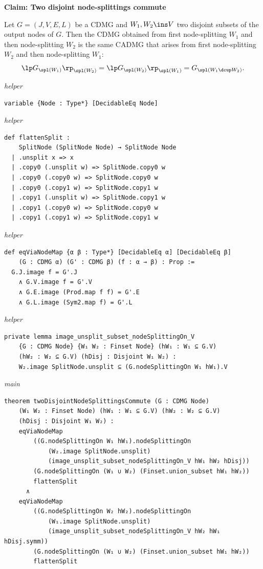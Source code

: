 \noindent\textbf{Claim: Two disjoint node-splittings commute}\par\smallskip
{\appendixTexSize
   Let $G=(J,V,E,L)$ be a CDMG and $W_1, W_2 \ins V$ two disjoint subsets of the output nodes of $G$.
   Then the CDMG obtained from first node-splitting $W_1$ and then node-splitting $W_2$ is the same CADMG that arises from first node-splitting $W_2$ and then node-splitting $W_1$:
   \[ \lp G_{\spl(W_1)} \rp_{\spl(W_2)} =  \lp G_{\spl(W_2)} \rp_{\spl(W_1)}  =  G_{\spl(W_1 \dcup W_2)}.   \]
\par}
\smallskip
{\small\textit{helper}}
\begin{verbatim}
variable {Node : Type*} [DecidableEq Node]
\end{verbatim}
{\small\textit{helper}}
\begin{verbatim}
def flattenSplit :
    SplitNode (SplitNode Node) → SplitNode Node
  | .unsplit x => x
  | .copy0 (.unsplit w) => SplitNode.copy0 w
  | .copy0 (.copy0 w) => SplitNode.copy0 w
  | .copy0 (.copy1 w) => SplitNode.copy1 w
  | .copy1 (.unsplit w) => SplitNode.copy1 w
  | .copy1 (.copy0 w) => SplitNode.copy0 w
  | .copy1 (.copy1 w) => SplitNode.copy1 w
\end{verbatim}
{\small\textit{helper}}
\begin{verbatim}
def eqViaNodeMap {α β : Type*} [DecidableEq α] [DecidableEq β]
    (G : CDMG α) (G' : CDMG β) (f : α → β) : Prop :=
  G.J.image f = G'.J
    ∧ G.V.image f = G'.V
    ∧ G.E.image (Prod.map f f) = G'.E
    ∧ G.L.image (Sym2.map f) = G'.L
\end{verbatim}
{\small\textit{helper}}
\begin{verbatim}
private lemma image_unsplit_subset_nodeSplittingOn_V
    {G : CDMG Node} {W₁ W₂ : Finset Node} (hW₁ : W₁ ⊆ G.V)
    (hW₂ : W₂ ⊆ G.V) (hDisj : Disjoint W₁ W₂) :
    W₂.image SplitNode.unsplit ⊆ (G.nodeSplittingOn W₁ hW₁).V
\end{verbatim}
{\small\textit{main}}
\begin{verbatim}
theorem twoDisjointNodeSplittingsCommute (G : CDMG Node)
    (W₁ W₂ : Finset Node) (hW₁ : W₁ ⊆ G.V) (hW₂ : W₂ ⊆ G.V)
    (hDisj : Disjoint W₁ W₂) :
    eqViaNodeMap
        ((G.nodeSplittingOn W₁ hW₁).nodeSplittingOn
            (W₂.image SplitNode.unsplit)
            (image_unsplit_subset_nodeSplittingOn_V hW₁ hW₂ hDisj))
        (G.nodeSplittingOn (W₁ ∪ W₂) (Finset.union_subset hW₁ hW₂))
        flattenSplit
      ∧
    eqViaNodeMap
        ((G.nodeSplittingOn W₂ hW₂).nodeSplittingOn
            (W₁.image SplitNode.unsplit)
            (image_unsplit_subset_nodeSplittingOn_V hW₂ hW₁ hDisj.symm))
        (G.nodeSplittingOn (W₁ ∪ W₂) (Finset.union_subset hW₁ hW₂))
        flattenSplit
\end{verbatim}
~%

